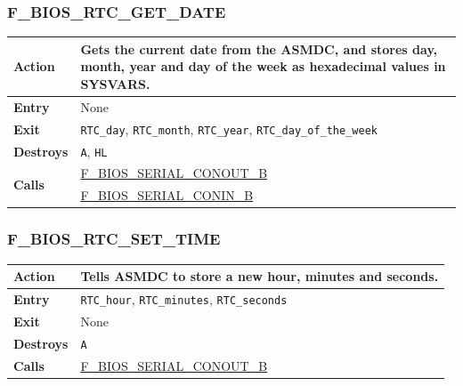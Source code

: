 \documentclass[a4paper,11pt]{article}
\begin{document}
        \subsubsection{F\_BIOS\_RTC\_GET\_DATE}
        \label{func:fbiosrtcgetdate}
        \begin{tabular}{l p{9cm}}
            \hline\textbf{Action}
            & Gets the current date from the \textbf{ASMDC}, and stores day,
            month, year and day of the week as hexadecimal values in SYSVARS. \\
            \hline\textbf{Entry} & None \\
            \hline\textbf{Exit} & \texttt{RTC\_day}, \texttt{RTC\_month},
            \texttt{RTC\_year}, \texttt{RTC\_day\_of\_the\_week} \\
            \hline\textbf{Destroys} & \texttt{A}, \texttt{HL} \\
            \hline\multirow[t]{2}{4em}{\textbf{Calls}}
            & \hyperref[func:fbiosserialconoutb]{F\_BIOS\_SERIAL\_CONOUT\_B}\\
            & \hyperref[func:fbiosserialconinb]{F\_BIOS\_SERIAL\_CONIN\_B}\\
            \hline
        \end{tabular}

         \subsubsection{F\_BIOS\_RTC\_SET\_TIME}
         \label{func:fbiosrtcsettime}
         \begin{tabular}{l p{9cm}}
             \hline\textbf{Action}
             & Tells \textbf{ASMDC} to store a new hour, minutes and seconds. \\
             \hline\textbf{Entry} & \texttt{RTC\_hour}, \texttt{RTC\_minutes},
             \texttt{RTC\_seconds} \\
             \hline\textbf{Exit} & None\\
             \hline\textbf{Destroys} & \texttt{A} \\
             \hline\textbf{Calls}
             & \hyperref[func:fbiosserialconoutb]{F\_BIOS\_SERIAL\_CONOUT\_B}\\
             \hline
         \end{tabular}
\end{document}
